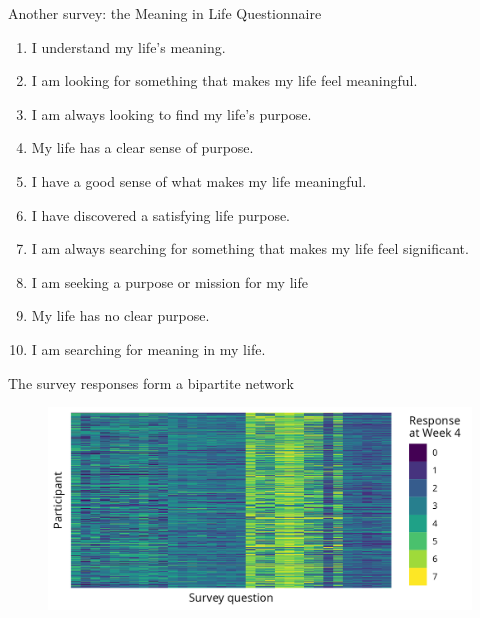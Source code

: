 \documentclass[aspectratio=169]{beamer}
\theoremstyle{remark}
\begin{document}
\begin{frame}{Another survey: the Meaning in Life Questionnaire}

    \begin{enumerate}
        \item I understand my life's meaning.
        \item I am looking for something that makes my life feel meaningful.
        \item I am always looking to find my life's purpose.
        \item My life has a clear sense of purpose.
        \item I have a good sense of what makes my life meaningful.
        \item I have discovered a satisfying life purpose.
        \item I am always searching for something that makes my life feel significant.
        \item I am seeking a purpose or mission for my life
        \item My life has no clear purpose.
        \item I am searching for meaning in my life.
    \end{enumerate}

    \footnotesize
\end{frame}

\begin{frame}{The survey responses form a bipartite network}
    \centering
    \begin{figure}
        \includegraphics{figures/week4-responses.png}
    \end{figure}
\end{frame}
\end{document}
